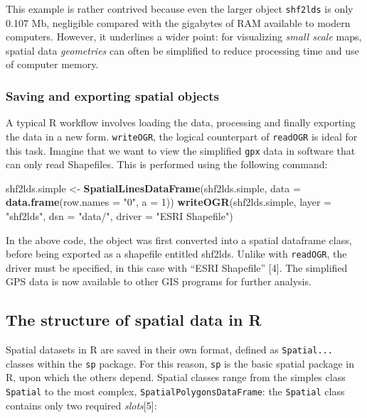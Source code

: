 \documentclass[]{article}
\newenvironment{Shaded}{}{}
\newcommand{\KeywordTok}[1]{\textcolor[rgb]{0.00,0.44,0.13}{\textbf{{#1}}}}
\newcommand{\DataTypeTok}[1]{\textcolor[rgb]{0.56,0.13,0.00}{{#1}}}
\newcommand{\DecValTok}[1]{\textcolor[rgb]{0.25,0.63,0.44}{{#1}}}
\newcommand{\StringTok}[1]{\textcolor[rgb]{0.25,0.44,0.63}{{#1}}}
\newcommand{\NormalTok}[1]{{#1}}
\begin{document}
This example is rather contrived because even the larger object
\texttt{shf2lds} is only 0.107 Mb, negligible compared with the
gigabytes of RAM available to modern computers. However, it underlines a
wider point: for visualizing \emph{small scale} maps, spatial data
\emph{geometries} can often be simplified to reduce processing time and
use of computer memory.

\subsubsection{Saving and exporting spatial objects}

A typical R workflow involves loading the data, processing and finally
exporting the data in a new form. \texttt{writeOGR}, the logical
counterpart of \texttt{readOGR} is ideal for this task. Imagine that we
want to view the simplified \texttt{gpx} data in software that can only
read Shapefiles. This is performed using the following command:

\begin{Shaded}
\begin{Highlighting}[]
\NormalTok{shf2lds.simple <- }\KeywordTok{SpatialLinesDataFrame}\NormalTok{(shf2lds.simple, }\DataTypeTok{data =} \KeywordTok{data.frame}\NormalTok{(}\DataTypeTok{row.names =} \StringTok{"0"}\NormalTok{, }
    \DataTypeTok{a =} \DecValTok{1}\NormalTok{))}
\KeywordTok{writeOGR}\NormalTok{(shf2lds.simple, }\DataTypeTok{layer =} \StringTok{"shf2lds"}\NormalTok{, }\DataTypeTok{dsn =} \StringTok{"data/"}\NormalTok{, }\DataTypeTok{driver =} \StringTok{"ESRI Shapefile"}\NormalTok{)}
\end{Highlighting}
\end{Shaded}
In the above code, the object was first converted into a spatial
dataframe class, before being exported as a shapefile entitled shf2lds.
Unlike with \texttt{readOGR}, the driver must be specified, in this case
with ``ESRI Shapefile'' {[}4{]}. The simplified GPS data is now
available to other GIS programs for further analysis.

\subsection{The structure of spatial data in R}

Spatial datasets in R are saved in their own format, defined as
\texttt{Spatial...} classes within the \texttt{sp} package. For this
reason, \texttt{sp} is the basic spatial package in R, upon which the
others depend. Spatial classes range from the simples class
\texttt{Spatial} to the most complex, \texttt{SpatialPolygonsDataFrame}:
the \texttt{Spatial} class contains only two required
\emph{slots}{[}5{]}:
\end{document}
